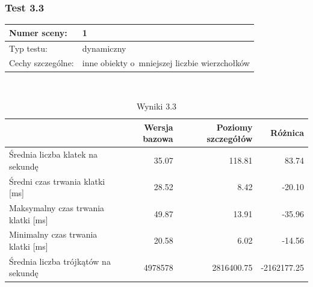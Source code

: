 \documentclass[a4paper,twoside,12pt]{book}
\begin{document}
\vbox{}

\subsubsection{Test 3.3}
\begin{tabular}{|l||l|}
\hline
Numer sceny: & 1 \\
\hline
Typ testu: & dynamiczny \\
\hline
Cechy szczególne: & inne obiekty o~mniejszej liczbie wierzchołków \\
\hline
\end{tabular}\\

\vbox{}

\begin{table}[H]
    \centering
    \caption{Wyniki 3.3}
    \label{tab:lod_test3}
    \begin{tabular}{|l||r|r|r|}
        \hline
        & Wersja bazowa & Poziomy szczegółów & Różnica \\
        \hline
        Średnia liczba klatek na sekundę & 35.07 & 118.81 & 83.74 \\
        \hline
        Średni czas trwania klatki [ms] & 28.52 & 8.42 & -20.10 \\
        \hline
        Maksymalny czas trwania klatki [ms] & 49.87 & 13.91 & -35.96 \\
        \hline
        Minimalny czas trwania klatki [ms] & 20.58 & 6.02 & -14.56 \\
        \hline
        Średnia liczba trójkątów na sekundę & 4978578 & 2816400.75 & -2162177.25 \\
        \hline
    \end{tabular}
\end{table}

\vbox{}
\end{document}
